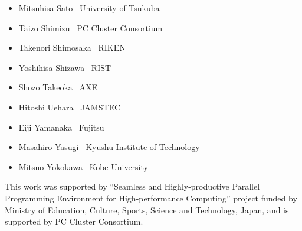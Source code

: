\documentclass[a4paper,11pt,twoside]{report}
\begin{document}
\begin{itemize}
\item Mitsuhisa Sato     \dotfill \ University of Tsukuba
\item Taizo Shimizu      \dotfill \ PC Cluster Consortium
\item Takenori Shimosaka \dotfill \ RIKEN
\item Yoshihisa Shizawa  \dotfill \ RIST
\item Shozo Takeoka      \dotfill \ AXE
\item Hitoshi Uehara     \dotfill \ JAMSTEC
\item Eiji Yamanaka      \dotfill \ Fujitsu
\item Masahiro Yasugi    \dotfill \ Kyushu Institute of Technology
\item Mitsuo Yokokawa    \dotfill \ Kobe University
\end{itemize}

This work was supported by ``Seamless and Highly-productive Parallel
Programming Environment for High-performance Computing'' project funded
by Ministry of Education, Culture, Sports, Science and Technology,
Japan, and is supported by PC Cluster Consortium.

\newpage
\mbox{}\newpage

\pagestyle{fancy}
\fancyhead{} %
\fancyhead[RE]{\leftmark}
\fancyhead[LO]{\rightmark}
\fancyhead[LE,RO]{\thepage}
\fancyfoot{} %
\renewcommand{\headrulewidth}{0pt}
\renewcommand{\footrulewidth}{0pt}



\cleardoublepage


\cleardoublepage






\cleardoublepage


\cleardoublepage


\cleardoublepage


\cleardoublepage


\end{document}
